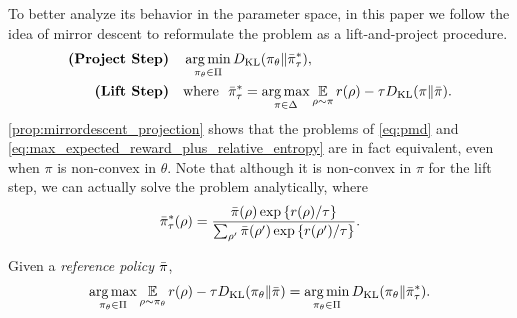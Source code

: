 To better analyze its behavior in the parameter space, in this paper we follow the idea of mirror descent to reformulate the problem as a lift-and-project procedure.
\begin{equation}
\label{eq:pmd}
\begin{split}
\text{\bf (Project Step)} \quad &\operatorname*{arg\,min}\limits_{\pi_\theta \in \Pi}{D_{\mathrm{KL}}( \pi_\theta \| \bar{\pi}_{\tau}^* )}, \\
\text{\bf (Lift Step)}  \quad & \text{where}\ \ \bar{\pi}_{\tau}^* =  \operatorname*{arg\,max}\limits_{\pi \in \Delta}{ \operatorname*{\mathbb{E}}\limits_{\rho \sim \pi}{  r(\rho)  - \tau D_{\mathrm{KL}}(\pi \| \bar{\pi}) } }. 
\end{split}
\end{equation}
\cref{prop:mirrordescent_projection} shows that the problems of \cref{eq:pmd} and \cref{eq:max_expected_reward_plus_relative_entropy} are in fact equivalent, even when $\pi$ is non-convex in $\theta$.
Note that although it is non-convex in $\pi$ for the lift step, we can actually solve the problem analytically, where
\begin{equation}
\label{eq:pitaustar}
\bar{\pi}_\tau^*(\rho) =  \frac{\bar{\pi}(\rho) \exp\left\{ r(\rho) / \tau \right\}}{ \sum_{\rho^{\prime}}{\bar{\pi}(\rho^{\prime}) \exp\left\{ r(\rho^{\prime}) / \tau \right\} } }.
\end{equation}
\begin{prop}
\label{prop:mirrordescent_projection}
Given a \emph{reference policy} $\bar{\pi}$,
\[
 \operatorname*{arg\,max}\limits_{\pi_\theta \in \Pi} { \operatorname*{\mathbb{E}}\limits_{\rho \sim \pi_\theta}{  r(\rho)  - \tau D_{\mathrm{KL}}(\pi_\theta \| \bar{\pi}) } } 
 = \operatorname*{arg\,min}\limits_{\pi_\theta \in \Pi}{ D_{\mathrm{KL}}(\pi_\theta \| \bar{\pi}_\tau^*) }.
\]
\end{prop}

